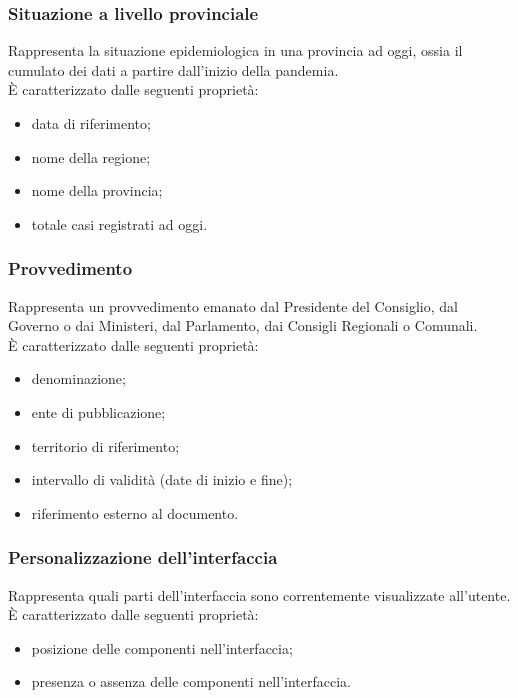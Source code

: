 \subsubsection{Situazione a livello provinciale}
\label{sss:situazione-livello-provinciale}
Rappresenta la situazione epidemiologica in una provincia ad oggi, ossia il cumulato dei dati a partire dall'inizio della pandemia.\\
È caratterizzato dalle seguenti proprietà:
\begin{itemize}
    \item data di riferimento;
    \item nome della regione;
    \item nome della provincia;
    \item totale casi registrati ad oggi.
\end{itemize}

\subsubsection{Provvedimento}
\label{sss:provvedimento}
Rappresenta un provvedimento emanato dal Presidente del Consiglio, dal Governo o dai Ministeri, dal Parlamento, dai Consigli Regionali o Comunali.\\
È caratterizzato dalle seguenti proprietà:
\begin{itemize}
    \item denominazione;
    \item ente di pubblicazione;
    \item territorio di riferimento;
    \item intervallo di validità (date di inizio e fine);
    \item riferimento esterno al documento.
\end{itemize}

\subsubsection{Personalizzazione dell'interfaccia}
\label{sss:personalizzazione-interfaccia}
Rappresenta quali parti dell'interfaccia sono correntemente visualizzate all'utente.\\
È caratterizzato dalle seguenti proprietà:
\begin{itemize}
    \item posizione delle componenti nell'interfaccia;
    \item presenza o assenza delle componenti nell'interfaccia.
\end{itemize}
